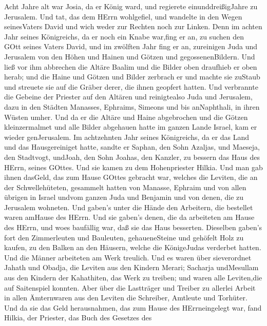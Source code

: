  Acht Jahre alt war Josia, da er König ward, und regierete
einunddreißigJahre zu Jerusalem.  Und tat, das dem HErrn
wohlgefiel, und wandelte in den Wegen seinesVaters David und wich weder
zur Rechten noch zur Linken.  Denn im achten Jahr seines
Königreichs, da er noch ein Knabe war,fing er an, zu suchen den GOtt
seines Vaters David, und im zwölften Jahr fing er an, zureinigen Juda
und Jerusalem von den Höhen und Hainen und Götzen und gegossenenBildern.
 Und ließ vor ihm abbrechen die Altäre Baalim und die Bilder
oben draufhieb er oben herab; und die Haine und Götzen und Bilder
zerbrach er und machte sie zuStaub und streuete sie auf die Gräber
derer, die ihnen geopfert hatten.  Und verbrannte die
Gebeine der Priester auf den Altären und reinigtealso Juda und
Jerusalem,  dazu in den Städten Manasses, Ephraims, Simeons
und bis anNaphthali, in ihren Wüsten umher.  Und da er die
Altäre und Haine abgebrochen und die Götzen kleinzermalmet und alle
Bilder abgehauen hatte im ganzen Lande Israel, kam er wieder
genJerusalem.  Im achtzehnten Jahr seines Königreichs, da er
das Land und das Hausgereiniget hatte, sandte er Saphan, den Sohn
Azaljas, und Maeseja, den Stadtvogt, undJoah, den Sohn Joahas, den
Kanzler, zu bessern das Haus des HErrn, seines GOttes.  Und
sie kamen zu dem Hohenpriester Hilkia. Und man gab ihnen dasGeld, das
zum Hause GOttes gebracht war, welches die Leviten, die an der
Schwellehüteten, gesammelt hatten von Manasse, Ephraim und von allen
übrigen in Israel undvom ganzen Juda und Benjamin und von denen, die zu
Jerusalem wohneten.  Und gaben's unter die Hände den
Arbeitern, die bestellet waren amHause des HErrn. Und sie gaben's denen,
die da arbeiteten am Hause des HErrn, und woes baufällig war, daß sie
das Haus besserten.  Dieselben gaben's fort den
Zimmerleuten und Bauleuten, gehaueneSteine und gehöfelt Holz zu kaufen,
zu den Balken an den Häusern, welche die KönigeJudas verderbet hatten.
 Und die Männer arbeiteten am Werk treulich. Und es waren
über sieverordnet Jahath und Obadja, die Leviten aus den Kindern Merari;
Sacharja undMesullam aus den Kindern der Kahathiten, das Werk zu
treiben; und waren alle Leviten,die auf Saitenspiel konnten.
 Aber über die Lastträger und Treiber zu allerlei Arbeit in
allen Ämternwaren aus den Leviten die Schreiber, Amtleute und Torhüter.
 Und da sie das Geld herausnahmen, das zum Hause des
HErrneingelegt war, fand Hilkia, der Priester, das Buch des Gesetzes des
